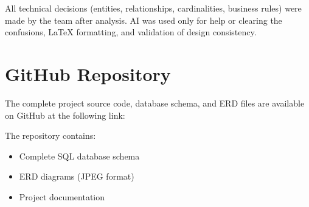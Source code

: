 \documentclass[12pt,a4paper]{article}
\begin{document}
All technical decisions (entities, relationships, cardinalities, business rules) were made by the team after analysis. AI was used only for help or clearing the confusions, LaTeX formatting, and validation of design consistency.

\section*{GitHub Repository}

The complete project source code, database schema, and ERD files are available on GitHub at the following link:

\vspace{0.5cm}

\centering
\href{https://github.com/Muhammad-Ahmad-99/Smart-Hostel-Management-System.git}{}

\vspace{0.5cm}

The repository contains:
\begin{itemize}
    \item Complete SQL database schema
    \item ERD diagrams (JPEG format)
    \item Project documentation
\end{itemize}
\end{document}
